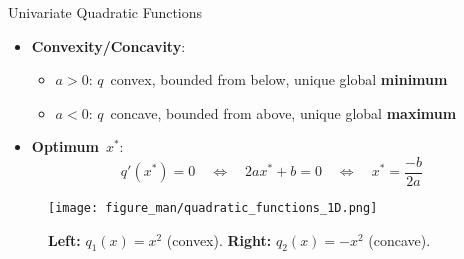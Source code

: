 \documentclass[11pt,compress,t,notes=noshow, xcolor=table]{beamer}
\begin{document}
\begin{vbframe}{Univariate Quadratic Functions}
\begin{itemize}
    \item \textbf{Convexity/Concavity}:
        \begin{itemize}
            \setlength{\itemindent}{-0.5cm}
            \item $a > 0$: $q$~convex, bounded from below, unique global \textbf{minimum}
            \item $a < 0$: $q$~concave, bounded from above, unique global \textbf{maximum}
        \end{itemize}
    
    \item \textbf{Optimum}~$x^\ast$:
        \vspace{-0.5\baselineskip}
        \begin{equation*}
            q'(x^\ast) = 0 \quad\Leftrightarrow \quad 2ax^\ast + b = 0 \quad \Leftrightarrow \quad x^\ast = \frac{-b}{2a}  	
        \end{equation*}
\end{itemize}

\vspace{-0.5\baselineskip}

\begin{figure}
    \centering
    \texttt{[image: figure\_man/quadratic\_functions\_1D.png]}
    \caption*{\textbf{Left:} $q_1(x) = x^2$ (convex).
        \textbf{Right:} $q_2(x) = - x^2$ (concave).}
\end{figure}

\end{vbframe}
  
\end{document}
